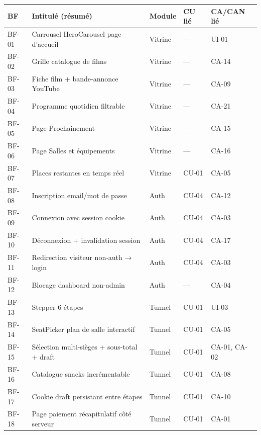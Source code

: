 \documentclass[12pt,a4paper,openany]{report}
\begin{document}
\begin{longtable}{p{1.1cm}p{5cm}p{1.3cm}p{1.2cm}l}
  \toprule
  \textbf{BF} & \textbf{Intitulé (résumé)} & \textbf{Module} & \textbf{CU lié} & \textbf{CA/CAN lié} \\
  \midrule
  \endhead
  \bottomrule
  \endfoot

  BF-01 & Carrousel HeroCarousel page d'accueil           & Vitrine & ---   & UI-01 \\
  BF-02 & Grille catalogue de films                       & Vitrine & ---   & CA-14 \\
  BF-03 & Fiche film + bande-annonce YouTube              & Vitrine & ---   & CA-09 \\
  BF-04 & Programme quotidien filtrable                   & Vitrine & ---   & CA-21 \\
  BF-05 & Page Prochainement                              & Vitrine & ---   & CA-15 \\
  BF-06 & Page Salles et équipements                      & Vitrine & ---   & CA-16 \\
  BF-07 & Places restantes en temps réel                  & Vitrine & CU-01 & CA-05 \\
  BF-08 & Inscription email/mot de passe                  & Auth    & CU-04 & CA-12 \\
  BF-09 & Connexion avec session cookie                   & Auth    & CU-04 & CA-03 \\
  BF-10 & Déconnexion + invalidation session              & Auth    & CU-04 & CA-17 \\
  BF-11 & Redirection visiteur non-auth → login           & Auth    & CU-04 & CA-03 \\
  BF-12 & Blocage dashboard non-admin                     & Auth    & ---   & CA-04 \\
  BF-13 & Stepper 6 étapes                                & Tunnel  & CU-01 & UI-03 \\
  BF-14 & SeatPicker plan de salle interactif             & Tunnel  & CU-01 & CA-05 \\
  BF-15 & Sélection multi-sièges + sous-total + draft     & Tunnel  & CU-01 & CA-01, CA-02 \\
  BF-16 & Catalogue snacks incrémentable                  & Tunnel  & CU-01 & CA-08 \\
  BF-17 & Cookie draft persistant entre étapes            & Tunnel  & CU-01 & CA-10 \\
  BF-18 & Page paiement récapitulatif côté serveur        & Tunnel  & CU-01 & CA-01 \\

\end{longtable}
\end{document}
